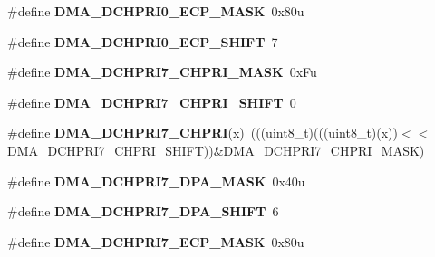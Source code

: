 \begin{DoxyCompactItemize}
\item 
\#define {\bfseries D\+M\+A\+\_\+\+D\+C\+H\+P\+R\+I0\+\_\+\+E\+C\+P\+\_\+\+M\+A\+SK}~0x80u\hypertarget{group__DMA__Register__Masks_ga691357e0e7e7aea1147f26d3e7b39ad7}{}\label{group__DMA__Register__Masks_ga691357e0e7e7aea1147f26d3e7b39ad7}

\item 
\#define {\bfseries D\+M\+A\+\_\+\+D\+C\+H\+P\+R\+I0\+\_\+\+E\+C\+P\+\_\+\+S\+H\+I\+FT}~7\hypertarget{group__DMA__Register__Masks_ga77a342f1130e8d8aaccfd88774100b38}{}\label{group__DMA__Register__Masks_ga77a342f1130e8d8aaccfd88774100b38}

\item 
\#define {\bfseries D\+M\+A\+\_\+\+D\+C\+H\+P\+R\+I7\+\_\+\+C\+H\+P\+R\+I\+\_\+\+M\+A\+SK}~0x\+Fu\hypertarget{group__DMA__Register__Masks_ga105d024654066128f4e62f32f8ca830d}{}\label{group__DMA__Register__Masks_ga105d024654066128f4e62f32f8ca830d}

\item 
\#define {\bfseries D\+M\+A\+\_\+\+D\+C\+H\+P\+R\+I7\+\_\+\+C\+H\+P\+R\+I\+\_\+\+S\+H\+I\+FT}~0\hypertarget{group__DMA__Register__Masks_ga0ae4f29819a1dfb16bbffee2db4d558e}{}\label{group__DMA__Register__Masks_ga0ae4f29819a1dfb16bbffee2db4d558e}

\item 
\#define {\bfseries D\+M\+A\+\_\+\+D\+C\+H\+P\+R\+I7\+\_\+\+C\+H\+P\+RI}(x)~(((uint8\+\_\+t)(((uint8\+\_\+t)(x))$<$$<$D\+M\+A\+\_\+\+D\+C\+H\+P\+R\+I7\+\_\+\+C\+H\+P\+R\+I\+\_\+\+S\+H\+I\+FT))\&D\+M\+A\+\_\+\+D\+C\+H\+P\+R\+I7\+\_\+\+C\+H\+P\+R\+I\+\_\+\+M\+A\+SK)\hypertarget{group__DMA__Register__Masks_gae06b4c8f0c37e7dc457e9a43673cbe4e}{}\label{group__DMA__Register__Masks_gae06b4c8f0c37e7dc457e9a43673cbe4e}

\item 
\#define {\bfseries D\+M\+A\+\_\+\+D\+C\+H\+P\+R\+I7\+\_\+\+D\+P\+A\+\_\+\+M\+A\+SK}~0x40u\hypertarget{group__DMA__Register__Masks_gab10ff916f8dfc06df312689bd2dd36f5}{}\label{group__DMA__Register__Masks_gab10ff916f8dfc06df312689bd2dd36f5}

\item 
\#define {\bfseries D\+M\+A\+\_\+\+D\+C\+H\+P\+R\+I7\+\_\+\+D\+P\+A\+\_\+\+S\+H\+I\+FT}~6\hypertarget{group__DMA__Register__Masks_ga531216c2edb80108b8c4cd13883aef06}{}\label{group__DMA__Register__Masks_ga531216c2edb80108b8c4cd13883aef06}

\item 
\#define {\bfseries D\+M\+A\+\_\+\+D\+C\+H\+P\+R\+I7\+\_\+\+E\+C\+P\+\_\+\+M\+A\+SK}~0x80u\hypertarget{group__DMA__Register__Masks_ga544768122b9d6cea0945411c14c5f79f}{}\label{group__DMA__Register__Masks_ga544768122b9d6cea0945411c14c5f79f}


\end{DoxyCompactItemize}
